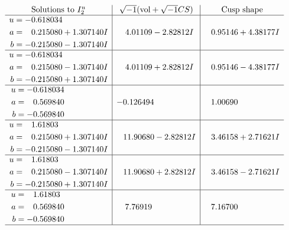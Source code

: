\documentclass[1p]{elsarticle_modified}
\theoremstyle{definition}
\newcommand{\I}{\sqrt{-1}}
\begin{document}
$$\begin{array}{c|c|c}  
\text{Solutions to }I^u_{2}& \I (\text{vol} + \sqrt{-1}CS) & \text{Cusp shape}\\
 \hline 
\begin{aligned}
u &= -0.618034\phantom{ +0.000000I} \\
a &= \phantom{-}0.215080 + 1.307140 I \\
b &= -0.215080 - 1.307140 I\end{aligned}
 & \phantom{-}4.01109 - 2.82812 I & \phantom{-}0.95146 + 4.38177 I \\ \hline\begin{aligned}
u &= -0.618034\phantom{ +0.000000I} \\
a &= \phantom{-}0.215080 - 1.307140 I \\
b &= -0.215080 + 1.307140 I\end{aligned}
 & \phantom{-}4.01109 + 2.82812 I & \phantom{-}0.95146 - 4.38177 I \\ \hline\begin{aligned}
u &= -0.618034\phantom{ +0.000000I} \\
a &= \phantom{-}0.569840\phantom{ +0.000000I} \\
b &= -0.569840\phantom{ +0.000000I}\end{aligned}
 & -0.126494\phantom{ +0.000000I} & \phantom{-}1.00690\phantom{ +0.000000I} \\ \hline\begin{aligned}
u &= \phantom{-}1.61803\phantom{ +0.000000I} \\
a &= \phantom{-}0.215080 + 1.307140 I \\
b &= -0.215080 - 1.307140 I\end{aligned}
 & \phantom{-}11.90680 - 2.82812 I & \phantom{-}3.46158 + 2.71621 I \\ \hline\begin{aligned}
u &= \phantom{-}1.61803\phantom{ +0.000000I} \\
a &= \phantom{-}0.215080 - 1.307140 I \\
b &= -0.215080 + 1.307140 I\end{aligned}
 & \phantom{-}11.90680 + 2.82812 I & \phantom{-}3.46158 - 2.71621 I \\ \hline\begin{aligned}
u &= \phantom{-}1.61803\phantom{ +0.000000I} \\
a &= \phantom{-}0.569840\phantom{ +0.000000I} \\
b &= -0.569840\phantom{ +0.000000I}\end{aligned}
 & \phantom{-}7.76919\phantom{ +0.000000I} & \phantom{-}7.16700\phantom{ +0.000000I}\\
 \hline 
 \end{array}$$\newpage
\end{document}
